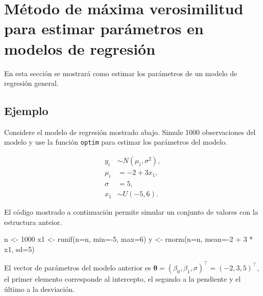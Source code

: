 \documentclass[
]{book}
\makeatletter
\newenvironment{Shaded}{\begin{snugshade}}{\end{snugshade}}
\newcommand{\AttributeTok}[1]{\textcolor[rgb]{0.77,0.63,0.00}{#1}}
\newcommand{\DecValTok}[1]{\textcolor[rgb]{0.00,0.00,0.81}{#1}}
\newcommand{\FunctionTok}[1]{\textcolor[rgb]{0.00,0.00,0.00}{#1}}
\newcommand{\NormalTok}[1]{#1}
\newcommand{\OtherTok}[1]{\textcolor[rgb]{0.56,0.35,0.01}{#1}}
\newcommand{\SpecialCharTok}[1]{\textcolor[rgb]{0.00,0.00,0.00}{#1}}
\newenvironment{kframe}{%
\medskip{}
\setlength{\fboxsep}{.8em}
 \def\at@end@of@kframe{}%
 \ifinner\ifhmode%
  \def\at@end@of@kframe{\end{minipage}}%
  \begin{minipage}{\columnwidth}%
 \fi\fi%
 \def\FrameCommand##1{\hskip\@totalleftmargin \hskip-\fboxsep
 \colorbox{shadecolor}{##1}\hskip-\fboxsep
     \hskip-\linewidth \hskip-\@totalleftmargin \hskip\columnwidth}%
 \MakeFramed {\advance\hsize-\width
   \@totalleftmargin\z@ \linewidth\hsize
   \@setminipage}}%
 {\par\unskip\endMakeFramed%
 \at@end@of@kframe}
\renewenvironment{Shaded}{\begin{kframe}}{\end{kframe}}
\makeatother
\begin{document}
\hypertarget{muxe9todo-de-muxe1xima-verosimilitud-para-estimar-paruxe1metros-en-modelos-de-regresiuxf3n}{%
\section{Método de máxima verosimilitud para estimar parámetros en modelos de regresión}\label{muxe9todo-de-muxe1xima-verosimilitud-para-estimar-paruxe1metros-en-modelos-de-regresiuxf3n}}

En esta sección se mostrará como estimar los parámetros de un modelo de regresión general.

\hypertarget{ejemplo-53}{%
\subsection*{Ejemplo}\label{ejemplo-53}}

Considere el modelo de regresión mostrado abajo. Simule 1000 observaciones del modelo y use la función \texttt{optim} para estimar los parámetros del modelo.

\begin{align*}
y_i &\sim N(\mu_i, \sigma^2), \\
\mu_i &= -2 + 3 x_1, \\
\sigma &= 5, \\
x_1 &\sim U(-5, 6).
\end{align*}

El código mostrado a continuación permite simular un conjunto de valores con la estructura anteior.

\begin{Shaded}
\begin{Highlighting}[]
\NormalTok{n }\OtherTok{\textless{}{-}} \DecValTok{1000}
\NormalTok{x1 }\OtherTok{\textless{}{-}} \FunctionTok{runif}\NormalTok{(}\AttributeTok{n=}\NormalTok{n, }\AttributeTok{min=}\SpecialCharTok{{-}}\DecValTok{5}\NormalTok{, }\AttributeTok{max=}\DecValTok{6}\NormalTok{)}
\NormalTok{y }\OtherTok{\textless{}{-}} \FunctionTok{rnorm}\NormalTok{(}\AttributeTok{n=}\NormalTok{n, }\AttributeTok{mean=}\SpecialCharTok{{-}}\DecValTok{2} \SpecialCharTok{+} \DecValTok{3} \SpecialCharTok{*}\NormalTok{ x1, }\AttributeTok{sd=}\DecValTok{5}\NormalTok{)}
\end{Highlighting}
\end{Shaded}

El vector de parámetros del modelo anterior es \(\boldsymbol{\theta}=(\beta_0, \beta_1, \sigma)^\top=(-2, 3, 5)^\top\), el primer elemento corresponde al intercepto, el segundo a la pendiente y el último a la desviación.
\end{document}
